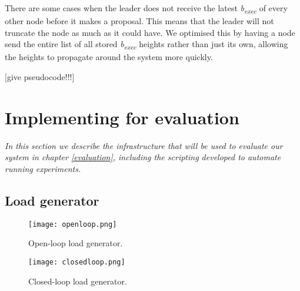There are some cases when the leader does not receive the latest \textit{b\textsubscript{exec}} of every other node before it makes a proposal. This means that the leader will not truncate the node as much as it could have. We optimised this by having a node send the entire list of all stored \textit{b\textsubscript{exec}} heights rather than just its own, allowing the heights to propagate around the system more quickly.

[give pseudocode!!!]



\section{Implementing for evaluation} \label{benchcode}

\textit{In this section we describe the infrastructure that will be used to evaluate our system in chapter \ref{evaluation}, including the scripting developed to automate running experiments.}

\subsection{Load generator} \label{loadgenerator}

\begin{figure}[h]
\centering
\texttt{[image: openloop.png]}
\caption{Open-loop load generator.}
\label{openloop}
\end{figure}

\begin{figure}[h]
\centering
\texttt{[image: closedloop.png]}
\caption{Closed-loop load generator.}
\label{closedloop}
\end{figure}

